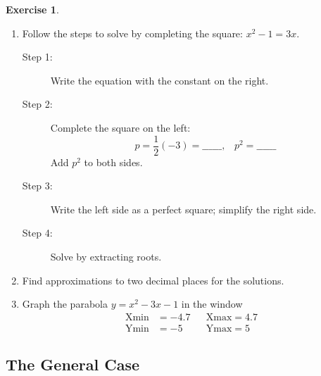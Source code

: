 \documentclass[10pt,]{book}
\theoremstyle{plain}
\theoremstyle{definition}
\theoremstyle{definition}
\theoremstyle{definition}
\newtheorem{exercise}[theorem]{Exercise}
\newcommand{\amp}{ & }
\begin{document}
\begin{exercise}\label{exercise-completing-the-square2}

	\leavevmode%
\begin{enumerate}[label=*\alph**]
\item\hypertarget{li-32}{}
		Follow the steps to solve by completing the square: \(x^2 − 1 = 3x\).
		\begin{description}
\item[Step 1: ]{}
				Write the equation with the constant on the right.
			\item[Step 2: ]{}
				Complete the square on the left:
				\begin{equation*}p = \frac{1}{2}(−3) ={}\text{______, } ~~~{} p^2 = \text{______}\end{equation*}
				Add \(p^2\) to both sides.
			\item[Step 3: ]{}
				Write the left side as a perfect square; simplify the right side.
			\item[Step 4: ]{}
				Solve by extracting roots.
			\end{description}
\item\hypertarget{li-37}{}
		Find approximations to two decimal places for the solutions.
	\item\hypertarget{li-38}{}
		Graph the parabola \(y = x^2 − 3x − 1\) in the window
        \begin{align}
        \text{Xmin} \amp = −4.7 \amp\amp \text{Xmax} = 4.7\\
        \text{Ymin} \amp = −5 \amp\amp \text{Ymax} = 5
        \end{align}
	\end{enumerate}

%
\end{exercise}
\typeout{************************************************}
\typeout{************************************************}
\subsection[The General Case]{The General Case}\label{subsection-8}
\end{document}
